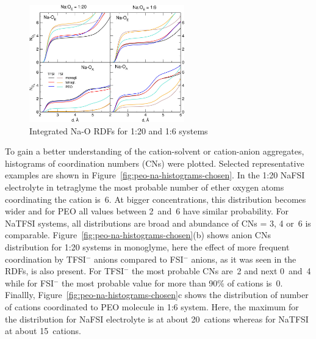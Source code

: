 \begin{figure}[H]
    \centering
    \includegraphics[width=0.6\textwidth]{img/3-structural-data-from-md-simulations/5-peo-na/rdf-int-na-o.png}
    \singlespacing
    \caption{Integrated Na-O RDFs for 1:20 and 1:6 systems}
    \label{fig:peo-na-rdf-int-na-o}
\end{figure}

To gain a better understanding of the cation-solvent or cation-anion aggregates, histograms of coordination numbers (CNs) were plotted. Selected representative examples are shown in Figure~\ref{fig:peo-na-histograms-chosen}. In the 1:20 NaFSI electrolyte in tetraglyme the most probable number of ether oxygen atoms coordinating the cation is~6. At bigger concentrations, this distribution becomes wider and for PEO all values between 2~and~6 have similar probability. For NaTFSI systems, all distributions are broad and abundance of CNs = 3, 4 or~6 is comparable. Figure~\ref{fig:peo-na-histograms-chosen}(b) shows anion CNs distribution for 1:20 systems in monoglyme, here the effect of more frequent coordination by TFSI$^{-}$ anions compared to FSI$^{-}$ anions, as it was seen in the RDFs, is also present. For TFSI$^{-}$ the most probable CNs are~2 and next 0~and~4 while for FSI$^{-}$ the most probable value for more than 90\% of cations is~0. Finallly, Figure~\ref{fig:peo-na-histograms-chosen}c shows the distribution of number of cations coordinated to PEO molecule in 1:6 system. Here, the maximum for the distribution for NaFSI electrolyte is at about 20~cations whereas for NaTFSI at about 15~cations.

